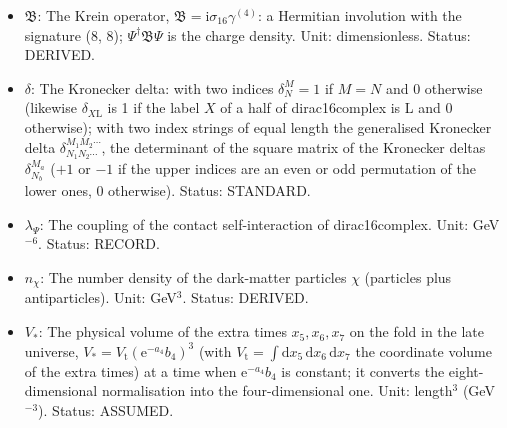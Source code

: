 \documentclass[
  10pt,
]{article}
\begin{document}
\begin{itemize}
\item
  \(\mathfrak{B}\): The Krein operator,
  \(\mathfrak{B} = \mathrm{i}\sigma_{16}\gamma^{(4)}\): a Hermitian
  involution with the signature (8, 8); \(\Psi^\dagger\mathfrak{B}\Psi\)
  is the charge density. Unit: dimensionless. Status: DERIVED.
\item
  \(\delta\): The Kronecker delta: with two indices \(\delta^M_N = 1\)
  if \(M = N\) and 0 otherwise (likewise \(\delta_{X\mathrm{L}}\) is 1
  if the label \(X\) of a half of dirac16complex is L and 0 otherwise);
  with two index strings of equal length the generalised Kronecker delta
  \(\delta^{M_1M_2\cdots}_{N_1N_2\cdots}\), the determinant of the
  square matrix of the Kronecker deltas \(\delta^{M_a}_{N_b}\) (\(+1\)
  or \(-1\) if the upper indices are an even or odd permutation of the
  lower ones, 0 otherwise). Status: STANDARD.
\item
  \(\lambda_\Psi\): The coupling of the contact self-interaction of
  dirac16complex. Unit: GeV\(^{-6}\). Status: RECORD.
\item
  \(n_\chi\): The number density of the dark-matter particles \(\chi\)
  (particles plus antiparticles). Unit: GeV\(^3\). Status: DERIVED.
\item
  \(V_*\): The physical volume of the extra times \(x_5, x_6, x_7\) on
  the fold in the late universe,
  \(V_* = V_{\mathrm{t}}(\mathrm{e}^{-a_4}b_4)^3\) (with
  \(V_{\mathrm{t}} = \int\mathrm{d}x_5\,\mathrm{d}x_6\,\mathrm{d}x_7\)
  the coordinate volume of the extra times) at a time when
  \(\mathrm{e}^{-a_4}b_4\) is constant; it converts the
  eight-dimensional normalisation into the four-dimensional one. Unit:
  length\(^3\) (GeV\(^{-3}\)). Status: ASSUMED.
\end{itemize}
\end{document}
